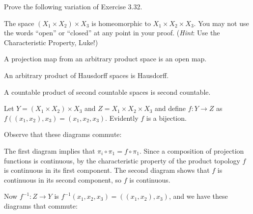 \documentclass{homework651}
\newcommand\ra{\rightarrow}
\begin{document}
\begin{aproblems}

\hproblem Prove the following variation of Exercise 3.32.
\begin{subproblems}
\item  The space $(X_1\times X_2)\times X_3$ is homeomorphic to
$X_1\times X_2 \times X_3$.  You may not use the words ``open'' or ``closed''
at any point in your proof.  (\emph{Hint}: Use the Characteristic Property, Luke!)

\item A projection map from an arbitrary product space is an open map.

\item An arbitrary product of Hausdorff spaces is Hausdorff.

\item A countable product of second countable spaces is second countable.

\end{subproblems}

\subsol
Let $Y = (X_1\times X_2)\times X_3$ and $Z = X_1\times X_2 \times X_3$
and define $f:Y\ra Z$ as $f((x_1,x_2),x_3)=(x_1,x_2,x_3)$.  Evidently
$f$ is a bijection.

Observe that these diagrams commute:

\centerline{
\qquad\qquad\qquad
{}}

The first diagram implies that $\pi_i\circ\pi_1=f\circ\pi_1$.  Since
a composition of projection functions is continuous, by the characteristic
property of the product topology $f$ is continuous in its first component.
The second diagram shows that $f$ is continuous in its
second component, so $f$ is continuous.

Now $f^{-1}:Z\ra Y$ is $f^{-1}(x_1,x_2,x_3)=((x_1,x_2),x_3)$, and
we have these diagrams that commute:

\centerline{
\qquad\qquad
{}
}


\end{aproblems}
\end{document}
